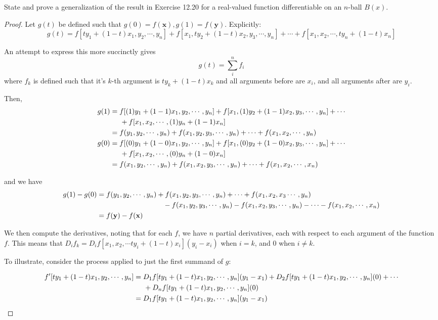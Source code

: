 \documentclass[12pt]{article}
\newcommand{\bvec}[1]{\textbf{#1}}
\newenvironment{problem}[2][Problem]{\begin{trivlist}
\item[\hskip \labelsep {\bfseries #1}\hskip \labelsep {\bfseries #2.}]}{\end{trivlist}}
\begin{document}
\begin{problem}{Apos. 12.21}
State and prove a generalization of the result in Exercise 12.20 for a real-valued function differentiable on an $n$-ball $B(x)$.
\end{problem}
\begin{proof}
Let $g(t)$ be defined such that $g(0)=f(\bvec{x}), g(1)=f(\bvec{y})$. Explicitly:
\[g(t)=f[ty_1+(1-t)x_1,y_2,\cdots,y_n]+f[x_1,ty_2+(1-t)x_2,y_3,\cdots,y_n]+\cdots+f[x_1,x_2,\cdots,ty_n+(1-t)x_n]\]

An attempt to express this more succinctly gives \[ g(t)=\sum_i^n f_i\] where $f_k$ is defined such that it's $k$-th argument is $ty_k+(1-t)x_k$ and all arguments before are $x_i$, and all arguments after are $y_i$.

Then,
\begin{align*}
g(1)&=f[(1)y_1+(1-1)x_1,y_2,\cdots,y_n]+f[x_1,(1)y_2+(1-1)x_2,y_3,\cdots,y_n]+\cdots\\&\hspace{.5cm}+f[x_1,x_2,\cdots,(1)y_n+(1-1)x_n]\\
&=f(y_1,y_2,\cdots,y_n)+f(x_1,y_2,y_3,\cdots,y_n)+\cdots+f(x_1,x_2,\cdots,y_n)\\
g(0)&=f[(0)y_1+(1-0)x_1,y_2,\cdots,y_n]+f[x_1,(0)y_2+(1-0)x_2,y_3,\cdots,y_n]+\cdots\\&\hspace{.5cm}+f[x_1,x_2,\cdots,(0)y_n+(1-0)x_n]\\
&=f(x_1,y_2,\cdots,y_n)+f(x_1,x_2,y_3,\cdots,y_n)+\cdots+f(x_1,x_2,\cdots,x_n)
\end{align*}

and we have
\begin{align*}
g(1)-g(0)&=f(y_1,y_2,\cdots,y_n)+f(x_1,y_2,y_3,\cdots,y_n)+\cdots+f(x_1,x_2,x_3\cdots,y_n)\\
&\hspace{1.3in}-f(x_1,y_2,y_3,\cdots,y_n)-f(x_1,x_2,y_3,\cdots,y_n)-\cdots-f(x_1,x_2,\cdots,x_n)\\
&=f(\bvec{y})-f(\bvec{x})
\end{align*}

We then compute the derivatives, noting that for each $f$, we have $n$ partial derivatives, each with respect to each argument of the function $f$. This means that $D_i f_k=D_if[x_1,x_2,\cdots ty_i+(1-t)x_i](y_i-x_i)$ when $i=k$, and $0$ when $i\not=k$.

To illustrate, consider the process applied to just the first summand of $g$:

\begin{align*}
f'[ty_1+(1-t)x_1,y_2,\cdots,y_n]&=D_1f[ty_1+(1-t)x_1,y_2,\cdots,y_n](y_1-x_1)+D_2f[ty_1+(1-t)x_1,y_2,\cdots,y_n](0)+\cdots\\
&\hspace{.5cm}+D_nf[ty_1+(1-t)x_1,y_2,\cdots,y_n](0)\\
&=D_1f[ty_1+(1-t)x_1,y_2,\cdots,y_n](y_1-x_1)
\end{align*}


\end{proof}
\end{document}
